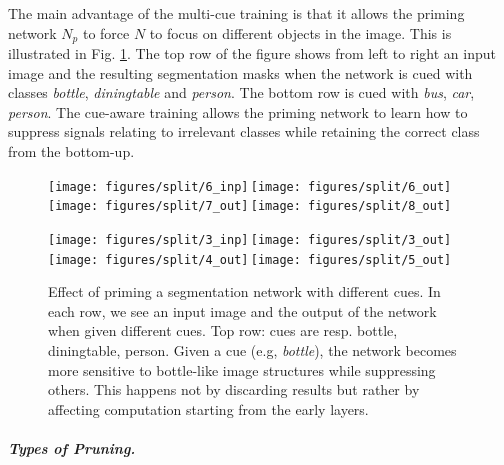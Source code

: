 \documentclass[10pt,letterpaper,twocolumn]{article}
\begin{document}
The main advantage of the multi-cue training is that it allows the
priming network $N_{p}$ to force $N$ to focus on different objects
in the image. This is illustrated in Fig. \ref{fig:Effect-of-training}.
The top row of the figure shows from left to right an input image
and the resulting segmentation masks when the network is cued with
classes \emph{bottle}, \emph{diningtable }and \emph{person}. The bottom
row is cued with \emph{bus}, \emph{car}, \emph{person}. The cue-aware
training allows the priming network to learn how to suppress signals
relating to irrelevant classes while retaining the correct class from
the bottom-up. 

\begin{figure}
\begin{centering}
\texttt{[image: figures/split/6\_inp]}\,\texttt{[image: figures/split/6\_out]}\,\texttt{[image: figures/split/7\_out]}\,\texttt{[image: figures/split/8\_out]}
\par\end{centering}
\begin{centering}
\texttt{[image: figures/split/3\_inp]}\,\texttt{[image: figures/split/3\_out]}\,\texttt{[image: figures/split/4\_out]}\,\texttt{[image: figures/split/5\_out]}
\par\end{centering}
\caption{\label{fig:Effect-of-training}Effect of priming a segmentation network
with different cues. In each row, we see an input image and the output
of the network when given different cues. Top row: cues are resp.
bottle, diningtable, person. Given a cue (e.g, \emph{bottle}), the
network becomes more sensitive to bottle-like image structures while
suppressing others. This happens not by discarding results but rather
by affecting computation starting from the early layers. }
\end{figure}

\subparagraph{Types of Pruning.\label{par:Types-of-Pruning.}}
\end{document}
